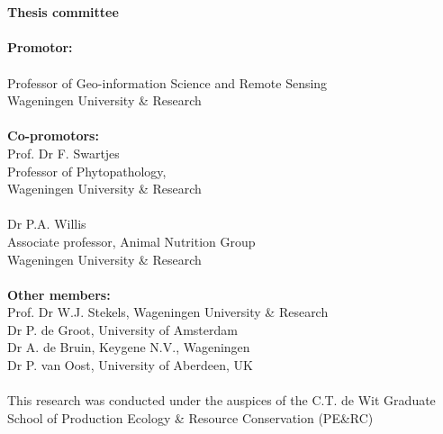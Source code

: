 \thispagestyle{empty}
\begin{center}
\Huge{\textbf{\thetitle}} \\
\vspace*{1cm}
\vspace*{1cm}
\vspace*{\fill}
\large{\theauthor}\\
\end{center}

\newpage
\thispagestyle{empty}
\vspace*{\fill}

    \textbf{Thesis committee} \\
    \\  
    \textbf{Promotor:} \\
    \firstpromotor{} \\
    Professor of Geo-information Science and Remote Sensing \\
    Wageningen University \& Research \\
    \\  
    \textbf{Co-promotors:} \\
    Prof. Dr F. Swartjes \\
    Professor of Phytopathology, \\
    Wageningen University \& Research \\
    \\
    Dr P.A. Willis \\  
    Associate professor, Animal Nutrition Group \\
    Wageningen University \& Research \\
    \\

    \textbf{Other members:}                                                                   \\
    Prof. Dr W.J. Stekels, Wageningen University \& Research \\  
    Dr P. de Groot, University of Amsterdam \\
    Dr A. de Bruin, Keygene N.V., Wageningen \\
    Dr P. van Oost, University of Aberdeen, UK \\
    \\  

    This research was conducted under the auspices of the
    C.T. de Wit Graduate School of Production Ecology \& Resource Conservation (PE\&RC)                         \\

